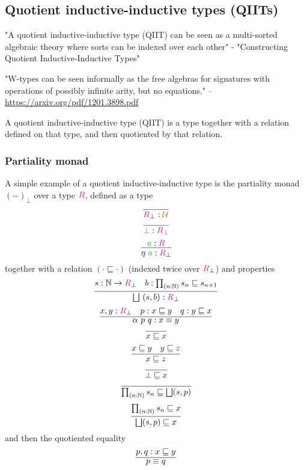 \documentclass[twoside,11pt,openright]{report}
\theoremstyle{plain} %
\theoremstyle{definition}
\theoremstyle{remark}
\newcommand*{\term}[1]{\textcolor{green!70!black}{#1}} %
\newcommand*{\type}[1]{\textcolor{magenta!90!black}{#1}}
\newcommand*{\universe}[1]{\textcolor{orange!80!black}{#1}}
\newcommand*{\constant}[1]{\textcolor{orange!60!black}{\ensuremath{\mathtt{#1}}}}
\newcommand*{\function}[1]{\textcolor{blue!60!black}{\ensuremath{\mathtt{#1}}}}
\begin{document}
\subsection{Quotient inductive-inductive types (QIITs)}
"A quotient inductive-inductive type (QIIT) can be seen as a multi-sorted algebraic theory where sorts can be indexed over each other" - "Constructing Quotient Inductive-Inductive Types"

"W-types can be seen informally as the free algebras for signatures with operations of possibly infinite arity, but no equations." -- \url{https://arxiv.org/pdf/1201.3898.pdf}

A quotient inductive-inductive type (QIIT) is a type together with a relation defined on that type, and then quotiented by that relation.
\subsubsection{Partiality monad}
A simple example of a quotient inductive-inductive type is the partiality monad \((-)_\bot\) over a type \(\type{R}\), defined as a type
\begin{equation}
  \infer{\type{R}_\bot : \universe{\mathcal{U}}}{}
\end{equation}
\begin{equation}
  \infer{\constant{\bot} : \type{R}_\bot}{}
\end{equation}
\begin{equation}
  \infer{\function{\eta}~\term{a} : \type{R}_\bot}{\term{a} : \type{R}}
\end{equation}
together with a relation \((\cdot \sqsubseteq \cdot)\) (indexed twice over \(\type{R}_\bot\)) and properties
\begin{equation}
  \infer{\bigsqcup~(s,b) : \type{R}_\bot}{s : \mathbb{N} \rightarrow \type{R}_\bot & b : \prod_{(n : \mathbb{N})} s_n \sqsubseteq s_{n+1} }
\end{equation}
\begin{equation}
  \infer{\alpha~p~q : x \equiv y}{x,y : \type{R}_\bot & p : x \sqsubseteq y & q : y \sqsubseteq x}
\end{equation}
\begin{equation}
  \infer{x \sqsubseteq x}{}
\end{equation}
\begin{equation}
  \infer{x \sqsubseteq z}{x \sqsubseteq y & y \sqsubseteq z}
\end{equation}
\begin{equation}
  \infer{\bot \sqsubseteq x}{}
\end{equation}
\begin{equation}
  \infer{\prod_{(n:\mathbb{N})} s_n \sqsubseteq \bigsqcup(s,p)}{}
\end{equation}
\begin{equation}
  \infer{\bigsqcup(s,p) \sqsubseteq x}{\prod_{(n:\mathbb{N})} s_n \sqsubseteq x}
\end{equation}
and then the quotiented equality
\begin{equation}
  \infer{p \equiv q}{p , q : x \sqsubseteq y}
\end{equation}
\end{document}
